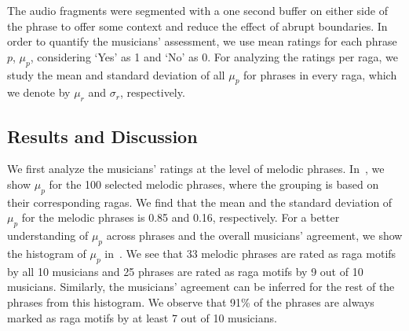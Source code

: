 {The audio fragments were segmented with a one second buffer on either side of the phrase to offer some context and reduce the effect of abrupt boundaries. %
In order to quantify the musicians' assessment, we use mean ratings for each phrase $p$, $\mu_p$, considering `Yes' as 1 and `No' as 0. For analyzing the ratings per \gls{raga}, we study the mean and standard deviation of all $\mu_p$ for phrases in every \gls{raga}, which we denote by $\mu_r$ and $\sigma_r$, respectively.


\subsection{Results and Discussion}
\label{sec:patterns_characterization_results_and_discussion}


We first analyze the musicians' ratings at the level of melodic phrases. In~, we show $\mu_p$ for the 100 selected melodic phrases, where the grouping is based on their corresponding \glspl{raga}. We find that the mean and the standard deviation of $\mu_p$ for the melodic phrases is 0.85 and 0.16, respectively. For a better understanding of $\mu_p$ across phrases and the overall musicians' agreement, we show the histogram of $\mu_p$ in~. We see that 33 melodic phrases are rated as \gls{raga} motifs by all 10 musicians and 25 phrases are rated as \gls{raga} motifs by 9 out of 10 musicians. Similarly, the musicians' agreement can be inferred for the rest of the phrases from this histogram. We observe that 91\% of the phrases are always marked as \gls{raga} motifs by at least 7 out of 10 musicians. 


}
